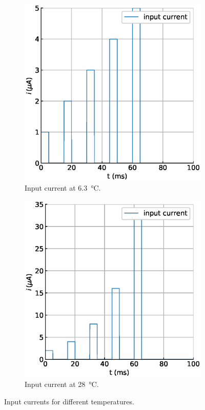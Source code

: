 \documentclass{scrartcl}			%
\begin{document}
\begin{figure}[H] 
  \begin{subfigure}[b]{0.5\linewidth}
    \centering
    \includegraphics[width=\linewidth]{imgs/istim_at_6.eps} 
    \caption{Input current at \SI{6.3}{\celsius}.} 
    \label{fig:istim_63} 
  \end{subfigure}%
  \quad
  \begin{subfigure}[b]{0.5\linewidth}
    \centering
    \includegraphics[width=\linewidth]{imgs/istim_at_28.eps} 
    \caption{Input current at \SI{28}{\celsius}.} 
    \label{fig:istim_28} 
    \end{subfigure} 
  \caption{Input currents for different temperatures.}
  \label{fig:istim} 
\end{figure}
\end{document}
